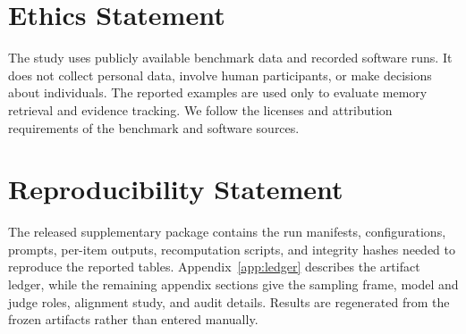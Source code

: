 \section*{Ethics Statement}

The study uses publicly available benchmark data and recorded software runs. It does not collect personal data, involve human participants, or make decisions about individuals. The reported examples are used only to evaluate memory retrieval and evidence tracking. We follow the licenses and attribution requirements of the benchmark and software sources.

\section*{Reproducibility Statement}

The released supplementary package contains the run manifests, configurations, prompts, per-item outputs, recomputation scripts, and integrity hashes needed to reproduce the reported tables. Appendix~\ref{app:ledger} describes the artifact ledger, while the remaining appendix sections give the sampling frame, model and judge roles, alignment study, and audit details. Results are regenerated from the frozen artifacts rather than entered manually.
